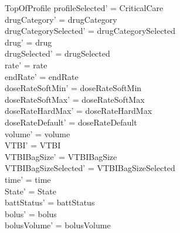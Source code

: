 \begin{schema}{TopOfProfile}
	profileSelected' = CriticalCare\\
	drugCategory' = drugCategory\\ 
	\pagebreak 
	drugCategorySelected' = drugCategorySelected\\
	drug' = drug\\ 
	drugSelected' = drugSelected\\
	rate' = rate\\
	endRate' = endRate\\
	doseRateSoftMin' = doseRateSoftMin\\
	doseRateSoftMax' = doseRateSoftMax\\
	doseRateHardMax' = doseRateHardMax\\
	doseRateDefault' = doseRateDefault\\
	volume' = volume\\
	VTBI' = VTBI\\
	VTBIBagSize' = VTBIBagSize\\ 
	VTBIBagSizeSelected' = VTBIBagSizeSelected\\
	time' = time\\ 
	State' = State\\
	battStatus' = battStatus\\
	bolus' = bolus\\
	bolusVolume' = bolusVolume\\

\end{schema}
